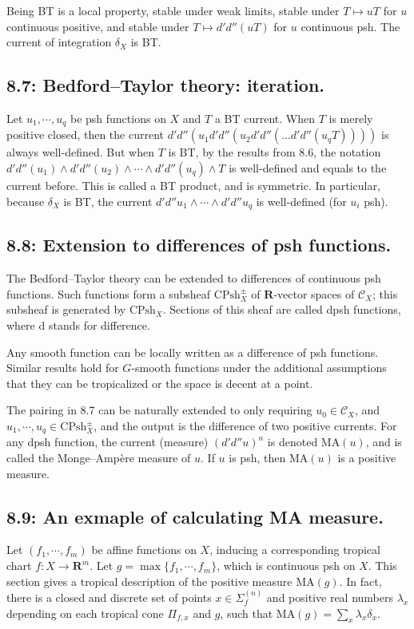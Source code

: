 \documentclass[12pt,reqno]{amsart}
\theoremstyle{definition}
\theoremstyle{remark}
\theoremstyle{citedrem}
\theoremstyle{cited}
\theoremstyle{citeddef}
\theoremstyle{step}
\newcommand{\MA}{\mathrm{MA}}
\begin{document}
Being BT is a local property, stable under weak limits, stable under $T \mapsto uT$ for $u$ continuous positive, and stable under $T \mapsto d'd''(uT)$ for $u$ continuous psh. The current of integration $\delta_X$ is BT. 

\subsection*{8.7: Bedford--Taylor theory: iteration. }Let $u_1, \cdots, u_q$ be psh functions on $X$ and $T$ a BT current. When $T$ is merely positive closed, then the current $d'd''(u_1 d'd''(u_2 d'd''(\ldots d'd''(u_qT))))$ is always well-defined. But when $T$ is BT, by the results from 8.6, the notation $d'd''(u_1) \wedge d'd''(u_2) \wedge \cdots \wedge d'd''(u_q) \wedge T$ is well-defined and equals to the current before. This is called a BT product, and is symmetric. In particular, because $\delta_X$ is BT, the current $d'd''u_1 \wedge \cdots \wedge d'd'' u_q$ is well-defined (for $u_i$ psh). 

\subsection*{8.8: Extension to differences of psh functions. }The Bedford--Taylor theory can be extended to differences of continuous psh functions. Such functions form a subsheaf $\mathrm{CPsh}_X^\pm$ of $\mathbf{R}$-vector spaces of $\mathcal{C}_X$; this subsheaf is generated by $\mathrm{CPsh}_X$. Sections of this sheaf are called dpsh functions, where d stands for difference. 

Any smooth function can be locally written as a difference of psh functions. Similar results hold for $G$-smooth functions under the additional assumptions that they can be tropicalized or the space is decent at a point. 

The pairing in 8.7 can be naturally extended to only requiring $u_0 \in \mathcal{C}_X$, and $u_1, \cdots, u_q \in \mathrm{CPsh}^\pm_X$, and the output is the difference of two positive currents. For any dpsh function, the current (measure) $(d'd''u)^n$ is denoted $\MA(u)$, and is called the Monge--Ampère measure of $u$. If $u$ is psh, then $\MA(u)$ is a positive measure. 

\subsection*{8.9: An exmaple of calculating MA measure. }Let $(f_1, \cdots, f_m)$ be affine functions on $X$, inducing a corresponding tropical chart $f \colon X \to \mathbf{R}^m.$ Let $g = \max\{f_1, \cdots, f_m\}$, which is continuous psh on $X$. This section gives a tropical description of the positive measure $\MA(g)$. In fact, there is a closed and discrete set of points $x \in \Sigma_f^{(n)}$ and positive real numbers $\lambda_x$ depending on each tropical cone $\Pi_{f,x}$ and $g$, such that $\MA(g) = \sum_x \lambda_x \delta_x.$
\end{document}
